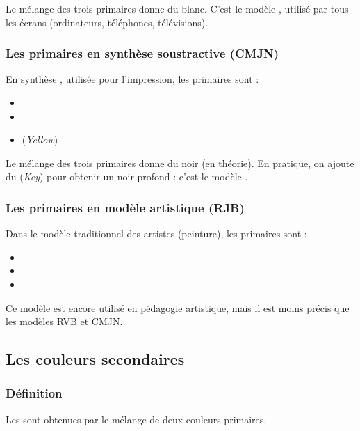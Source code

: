 Le mélange des trois primaires donne du blanc. C'est le modèle , utilisé par tous les écrans (ordinateurs, téléphones, télévisions).

\subsubsection{Les primaires en synthèse soustractive (CMJN)}

En synthèse , utilisée pour l'impression, les primaires sont :

\begin{itemize}
    \item {}
    \item {}
    \item {} (\emph{Yellow})
\end{itemize}

Le mélange des trois primaires donne du noir (en théorie). En pratique, on ajoute du  (\emph{Key}) pour obtenir un noir profond : c'est le modèle .

\subsubsection{Les primaires en modèle artistique (RJB)}

Dans le modèle traditionnel des artistes (peinture), les primaires sont :

\begin{itemize}
    \item {}
    \item {}
    \item {}
\end{itemize}

Ce modèle est encore utilisé en pédagogie artistique, mais il est moins précis que les modèles RVB et CMJN.

\subsection{Les couleurs secondaires}

\subsubsection{Définition}

Les  sont obtenues par le mélange de deux couleurs primaires.

